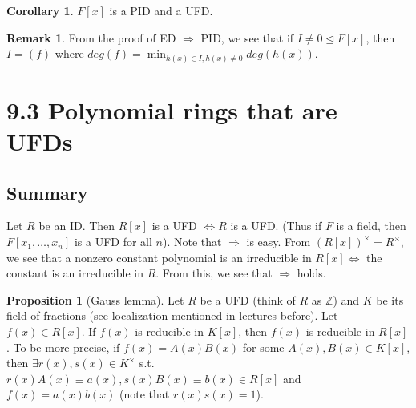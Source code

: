 \documentclass{article}
\theoremstyle{definition}
\newtheorem{rem}{Remark}
\newtheorem{cor}{Corollary}
\newtheorem{prop}{Proposition}
\begin{document}
\begin{cor}
  $F[x]$ is a PID and a UFD.
\end{cor}

\begin{rem}
  From the proof of ED $\Rightarrow$ PID, we see that if $I \neq 0 \trianglelefteq F[x]$, then $I = (f)$ where $deg(f) = \min_{h(x) \in I, h(x) \neq 0} deg(h(x))$. 
\end{rem}


\section{9.3 Polynomial rings that are UFDs}

\subsection{Summary}

Let $R$ be an ID. Then $R[x]$ is a UFD $\Leftrightarrow R$ is a UFD. (Thus if $F$ is a field, then $F[x_1, \hdots, x_n]$ is a UFD for all $n$). Note that $\Rightarrow $ is easy. From $(R[x])^\times = R^\times$, we see that a nonzero constant polynomial is an irreducible in $R[x] \Leftrightarrow$ the constant is an irreducible in $R$. From this, we see that $\Rightarrow$ holds. 

\begin{prop}[Gauss lemma]
  Let $R$ be a UFD (think of $R$ as $\mathbb{Z}$) and $K$ be its field of fractions (see localization mentioned in lectures before). Let $f(x) \in R[x]$. If $f(x)$ is reducible in $K[x]$, then $f(x)$ is reducible in $R[x]$. To be more precise, if $f(x) = A(x) B(x)$ for some $A(x), B(x) \in K[x]$, then $\exists r(x), s(x) \in K^\times$ s.t. $r(x) A(x) \equiv a(x), s(x) B(x) \equiv b(x) \in R[x]$  and $f(x) = a(x) b(x)$ (note that $r(x) s(x) = 1$).
\end{prop}
\end{document}
